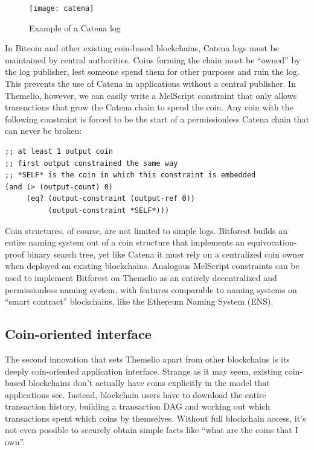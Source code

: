 \documentclass[headinclude,12pt]{scrbook}
\begin{document}
\begin{figure}
    \centering \texttt{[image: catena]}
    \caption{Example of a Catena log}
    \label{fig:catena}
\end{figure}

In Bitcoin and other existing coin-based blockchains, Catena logs must be maintained by central authorities. Coins forming the chain must be ``owned'' by the log publisher, lest someone spend them for other purposes and ruin the log. This prevents the use of Catena in applications without a central publisher. In Themelio, however, we can easily write a MelScript constraint that only allows transactions that grow the Catena chain to spend the coin. Any coin with the following constraint is forced to be the start of a permissionless Catena chain that can never be broken:
\begin{lstlisting}
;; at least 1 output coin
;; first output constrained the same way
;; *SELF* is the coin in which this constraint is embedded
(and (> (output-count) 0)
     (eq? (output-constraint (output-ref 0))
          (output-constraint *SELF*)))
\end{lstlisting}

Coin structures, of course, are not limited to simple logs. Bitforest \cite{dong2018bitforest} builds an entire naming system out of a coin structure that implements an equivocation-proof binary search tree, yet like Catena it must rely on a centralized coin owner when deployed on existing blockchains. Analogous MelScript constraints can be used to implement Bitforest on Themelio as an entirely decentralized and permissionless naming system, with features comparable to naming systems on ``smart contract'' blockchains, like the Ethereum Naming System (ENS).

\subsection{Coin-oriented interface}

The second innovation that sets Themelio apart from other blockchains is its deeply coin-oriented application interface. Strange as it may seem, existing coin-based blockchains don't actually have coins explicitly in the model that applications see. Instead, blockchain users have to download the entire transaction history, building a transaction DAG and working out which transactions spent which coins by themselves. Without full blockchain access, it's not even possible to securely obtain simple facts like ``what are the coins that I own''.
\end{document}
